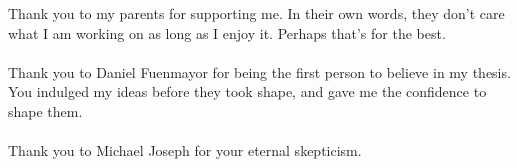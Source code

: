 \noindent Thank you to my parents for supporting me. In their own words, they don't 
care what I am working on as long as I enjoy it. Perhaps that's for the best.
\\\\
Thank you to Daniel Fuenmayor for being the first person to believe in my 
thesis. 
You indulged my ideas before they took shape, and gave me the confidence to
shape them.
\\\\
Thank you to Michael Joseph for your eternal skepticism.
\clearpage